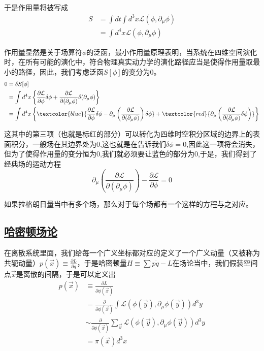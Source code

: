 于是作用量将被写成
\begin{align*}
    S&=\int dt\int d^3x\mathcal{L}(\phi,\partial_\mu\phi)\\
    &=\int d^4x \mathcal{L}(\phi,\partial_\mu\phi)
\end{align*}

作用量显然是关于场算符$\phi$的泛函，最小作用量原理表明，当系统在四维空间演化时，在所有可能的演化中，符合物理真实动力学的演化路径应当是使得作用量取最小的路径，因此，我们考虑泛函$S[\phi]$的变分为$0$。
\begin{align*}
    0&=\delta S[\phi]\\
    &=\int d^4x \left\{\frac{\partial\mathcal{L}}{\partial \phi}\delta\phi+\frac{\partial \mathcal{L}}{\partial(\partial_\mu \phi)}\delta(\partial_\mu \phi)\right\}\\
    &=\int d^4x \left\{\textcolor{blue}{\frac{\partial\mathcal{L}}{\partial \phi}\delta \phi-\partial_\mu\left(\frac{\partial \mathcal{L}}{\partial(\partial_\mu\phi)}\right)\delta \phi}+\textcolor{red}{\partial_{\mu}\left(\frac{\partial \mathcal{L}}{\partial(\partial_\mu\phi)}\delta\phi\right)}\right\}
\end{align*}

这其中的第三项（也就是标红的部分）可以转化为四维时空积分区域的边界上的表面积分，一般场在其边界处为$0$,这也就是在告诉我们$\delta \phi=0$,因此这一项将会消失，但为了使得作用量的变分恒为$0$,我们就必须要让蓝色的部分为$0$,于是，我们得到了经典场的运动方程
\begin{equation*}
    \partial_\mu\left(\frac{\partial \mathcal{L}}{\partial(\partial_\mu\phi)}\right)-\frac{\partial\mathcal{L}}{\partial \phi}=0
\end{equation*}

如果拉格朗日量当中有多个场，那么对于每个场都有一个这样的方程与之对应。


\subsection{\protect\hyperlink{:}{哈密顿场论}}

在离散系统里面，我们给每一个广义坐标都对应的定义了一个广义动量（又被称为共轭动量）$p(\vec{x})\equiv\frac{\partial L}{\partial \dot{q}}$，于是哈密顿量$H\equiv\sum p\dot{q}-L$在场论当中，我们假装空间点$\vec{x}$是离散的间隔，于是可以定义出
\begin{align*}
    p(\vec{x})&\equiv\frac{\partial L}{\partial \phi(\vec{x})}\\
    &=\frac{\partial}{\partial \phi(\vec{x})}\int\mathcal{L}(\phi(\vec{y}),\partial_\mu\phi(\vec{y}))d^3y\\
    &\sim \frac{\partial}{\partial \phi(\vec{x})}\sum_{\vec{y}}\mathcal{L}(\phi(\vec{y}),\partial_\mu\phi(\vec{y}))d^3y\\
    &=\pi(\vec{x})d^3x
\end{align*}

